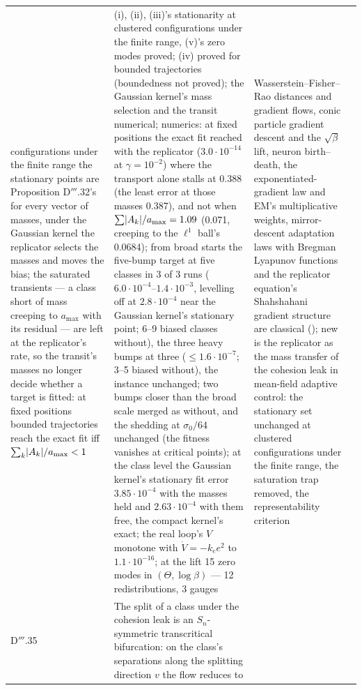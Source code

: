 {\begin{longtable}{@{}>{\raggedright\arraybackslash}p{}>{\raggedright\arraybackslash}p{}%
>{\raggedright\arraybackslash}p{}>{\raggedright\arraybackslash}p{}@{}}
configurations under the finite range the stationary points are Proposition D$'''$.32's for every vector of masses,
under the Gaussian kernel the replicator selects the masses and moves the bias; the saturated transients --- a class
short of mass creeping to $a_{\max}$ with its residual --- are left at the replicator's rate, so the transit's masses
no longer decide whether a target is fitted: at fixed positions bounded trajectories reach the exact fit iff
$\sum_k\lvert A_k\rvert/a_{\max} < 1$
& (i), (ii), (iii)'s stationarity at clustered configurations under the finite range, (v)'s zero modes proved; (iv)
proved for bounded trajectories (boundedness not proved); the Gaussian kernel's mass selection and the transit
numerical; numerics: at fixed positions the exact fit reached with the replicator ($3.0\cdot10^{-14}$ at
$\gamma = 10^{-2}$) where the transport alone stalls at 0.388 (the least error at those masses 0.387), and not when
$\sum\lvert A_k\rvert/a_{\max} = 1.09$ (0.071, creeping to the $\ell^1$ ball's 0.0684); from broad starts the five-bump
target at five classes in 3 of 3 runs ($6.0\cdot10^{-4}$--$1.4\cdot10^{-3}$, levelling off at $2.8\cdot10^{-4}$ near
the Gaussian kernel's stationary point; 6--9 biased classes without), the three heavy bumps at three
($\le1.6\cdot10^{-7}$; 3--5 biased without), the instance unchanged; two bumps closer than the broad scale merged as
without, and the shedding at $\sigma_0/64$ unchanged (the fitness vanishes at critical points); at the class level the
Gaussian kernel's stationary fit error $3.85\cdot10^{-4}$ with the masses held and $2.63\cdot10^{-4}$ with them free,
the compact kernel's exact; the real loop's $V$ monotone with $\dot V = -k_ee^2$ to $1.1\cdot10^{-16}$; at the lift 15
zero modes in $(\Theta,\log\beta)$ --- 12 redistributions, 3 gauges
& Wasserstein--Fisher--Rao distances and gradient flows, conic particle gradient descent and the $\sqrt\beta$ lift,
neuron birth--death, the exponentiated-gradient law and EM's multiplicative weights, mirror-descent adaptation laws
with Bregman Lyapunov functions and the replicator equation's Shahshahani gradient structure are classical
(\cite{S62}); new is the replicator as the mass transfer of the cohesion leak in mean-field adaptive control: the
stationary set unchanged at clustered configurations under the finite range, the saturation trap removed, the
representability criterion\\
\addlinespace[0.5pt]
D$'''$.35 & The split of a class under the cohesion leak is an $S_n$-symmetric transcritical bifurcation: on the
class's separations along the splitting direction $v$ the flow reduces to

\end{longtable}}
